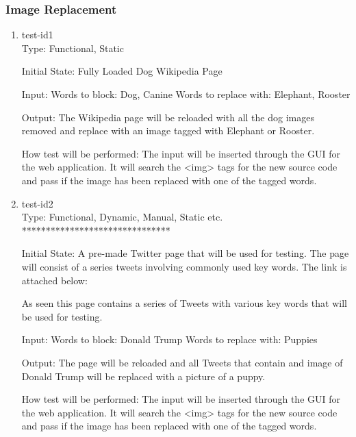 \documentclass[12pt, titlepage]{article}
\begin{document}
\subsubsection{Image Replacement}
\begin{enumerate}
\item{test-id1\\}
Type: Functional, Static
					
Initial State: Fully Loaded Dog Wikipedia Page
					
Input: Words to block: Dog, Canine
Words to replace with: Elephant, Rooster
					
Output: The Wikipedia page will be reloaded with all the dog images removed and replace with an image tagged with Elephant or Rooster.
					
How test will be performed: The input will be inserted through the GUI for the web application. It will search the <img> tags for the new source code and pass if the image has been replaced with one of the tagged words. 
					
\item{test-id2\\}
Type: Functional, Dynamic, Manual, Static etc. *******************************
					
Initial State: A pre-made Twitter page that will be used for testing. The page will consist of  a series tweets involving commonly used key words. The link is attached below:

As seen this page contains a series of Tweets with various key words that will be used for testing.
					
Input:  Words to block: Donald Trump
Words to replace with: Puppies
					
Output: The page will be reloaded and all Tweets that contain and image of Donald Trump will be replaced with a picture of a puppy.

How test will be performed: The input will be inserted through the GUI for the web application. It will search the <img> tags for the new source code and pass if the image has been replaced with one of the tagged words. 
\end{enumerate}
\end{document}
